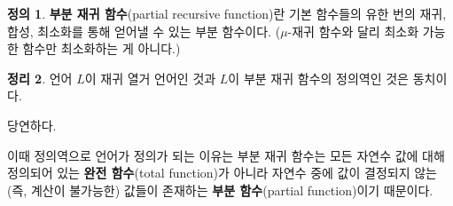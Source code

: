 \documentclass[b5paper, 11pt]{book}
\theoremstyle{definition}
\newtheorem{defn}{정의}[chapter]
\newtheorem{thm}[defn]{정리}
\newenvironment{pf*}{\pushQED{\qed}\pf}
{\popQED\endpf}
\begin{document}
\begin{defn}
    \textbf{부분 재귀 함수}(partial recursive function)란 기본 함수들의 유한 번의 재귀, 합성, 최소화를 통해 얻어낼 수 있는 부분 함수이다. ($\mu$-재귀 함수와 달리 최소화 가능한 함수만 최소화하는 게 아니다.)
\end{defn}
\begin{thm}
    언어 $L$이 재귀 열거 언어인 것과 $L$이 부분 재귀 함수의 정의역인 것은 동치이다. 
\end{thm}
\begin{pf*}
    당연하다.
\end{pf*}
이때 정의역으로 언어가 정의가 되는 이유는 부분 재귀 함수는 모든 자연수 값에 대해 정의되어 있는 \textbf{완전 함수}(total function)가 아니라 자연수 중에 값이 결정되지 않는(즉, 계산이 불가능한) 값들이 존재하는 \textbf{부분 함수}(partial function)이기 때문이다.
\end{document}
